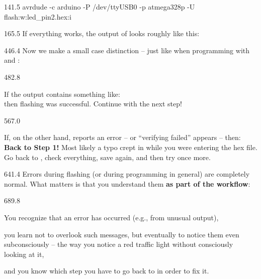 \documentclass{aslab}
\begin{document}
\begin{region}{141.5}
\fontsize{10bp}{12bp}\ttfamily
avrdude -c arduino -P /dev/ttyUSB0 -p atmega328p -U flash:w:led\_pin2.hex:i
\end{region}

\begin{region}{165.5}
If everything works, the output of  looks roughly like this:
\end{region}


\begin{region}{446.4}
Now we make a small case distinction -- just like when programming with
 and :
\end{region}

\begin{region}{482.8}
\begin{bullets}
\item If the output contains something like:
  \blank
  \\
  \blank
  then flashing was successful. Continue with the next step!
\end{bullets}
\end{region}

\begin{region}{567.0}
\begin{bullets}
\item If, on the other hand,  reports an error -- or
  ``verifying failed'' appears -- then:
  \blank
  \textbf{Back to Step 1!} Most likely a typo crept in while you were
  entering the hex file. Go back to , check everything, save
  again, and then try once more.
\end{bullets}
\end{region}

\begin{region}{641.4}
Errors during flashing (or during programming in general) are completely
normal. What matters is that you understand them \textbf{as part of the
workflow}:
\end{region}

\begin{region}[pitch=12.6]{689.8}
\begin{dashlist}
\item You recognize that an error has occurred (e.g., from unusual
   output),
\item you learn not to overlook such messages, but eventually to notice
  them even subconsciously -- the way you notice a red traffic light
  without consciously looking at it,
\item and you know which step you have to go back to in order to fix it.
\end{dashlist}
\end{region}
\end{document}
